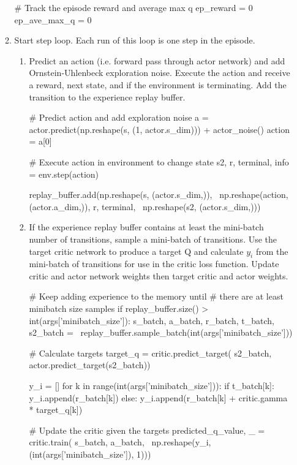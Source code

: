 \begin{enumerate}
\begin{enumerate}
\begin{python}[caption={Episode Reset},label={list:ep_reset},xleftmargin=\dimexpr-\csname @totalleftmargin\endcsname]
# Track the episode reward and average max q
ep_reward = 0
ep_ave_max_q = 0
	\end{python}
	\item Start step loop. Each run of this loop is one step in the episode.
		\begin{enumerate}
		\item Predict an action (i.e. forward pass through actor network) and add Ornstein-Uhlenbeck exploration noise. Execute the action and receive a reward, next state, and if the environment is terminating. Add the transition to the experience replay buffer.
		\begin{python}[caption={Actor Predict and Step},label={list:act_pred_step},xleftmargin=\dimexpr-\csname @totalleftmargin\endcsname]
# Predict action and add exploration noise
a = actor.predict(np.reshape(s, (1, actor.s_dim))) + actor_noise()
action = a[0]

# Execute action in environment to change state
s2, r, terminal, info = env.step(action)

replay_buffer.add(np.reshape(s, (actor.s_dim,)), \
        np.reshape(action, (actor.a_dim,)), r, terminal, \
        np.reshape(s2, (actor.s_dim,)))
		\end{python}
		\item If the experience replay buffer contains at least the mini-batch number of transitions, sample a mini-batch of transitions. Use the target critic network to produce a target Q and calculate $y_i$ from the mini-batch of transitions for use in the critic loss function. Update critic and actor network weights then target critic and actor weights.
		\begin{python}[caption={Network Update},label={list:net_update},xleftmargin=\dimexpr-\csname @totalleftmargin\endcsname]
# Keep adding experience to the memory until
# there are at least minibatch size samples
if replay_buffer.size() > int(args['minibatch_size']):
	s_batch, a_batch, r_batch, t_batch, s2_batch = \
	  	replay_buffer.sample_batch(int(args['minibatch_size']))
	
	# Calculate targets
	target_q = critic.predict_target(
	  	s2_batch, actor.predict_target(s2_batch))
	
	y_i = []
	for k in range(int(args['minibatch_size'])):
	  	if t_batch[k]:
	      	y_i.append(r_batch[k])
	  	else:
	      	y_i.append(r_batch[k] + critic.gamma * target_q[k])
	
	# Update the critic given the targets
	predicted_q_value, _ = critic.train( s_batch, a_batch, \
	  	np.reshape(y_i, (int(args['minibatch_size']), 1)))
	

\end{python}
\end{enumerate}
\end{enumerate}
\end{enumerate}
